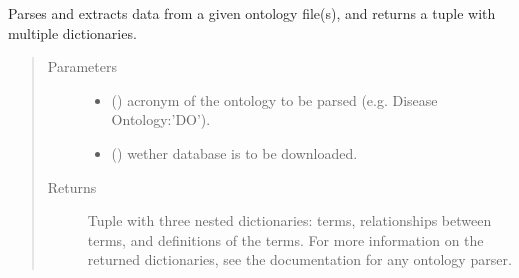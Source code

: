 \documentclass[letterpaper,10pt,english]{sphinxmanual}
\begin{document}

\begin{fulllineitems}
\label{\detokenize{_autosummary/graphdb_builder.ontologies:graphdb_builder.ontologies.ontologies_controller.parse_ontology}}
Parses and extracts data from a given ontology file(s), and returns a tuple with multiple dictionaries.
\begin{quote}\begin{description}
\item[{Parameters}] \leavevmode\begin{itemize}
\item {} 
 () \textendash{} acronym of the ontology to be parsed (e.g. Disease Ontology:’DO’).

\item {} 
 () \textendash{} wether database is to be downloaded.

\end{itemize}

\item[{Returns}] \leavevmode
Tuple with three nested dictionaries: terms, relationships between terms, and definitions of the terms.            For more information on the returned dictionaries, see the documentation for any ontology parser.

\end{description}\end{quote}

\end{fulllineitems}

\end{document}
